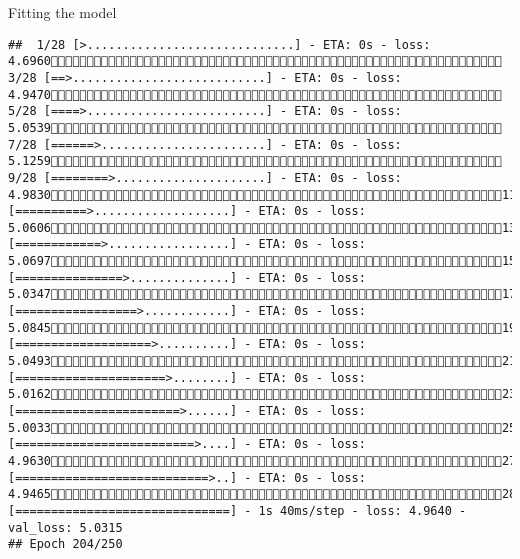 \documentclass[
  ignorenonframetext,
]{beamer}
\begin{document}
\begin{frame}[fragile]{Fitting the model}
\begin{verbatim}
##  1/28 [>.............................] - ETA: 0s - loss: 4.6960 3/28 [==>...........................] - ETA: 0s - loss: 4.9470 5/28 [====>.........................] - ETA: 0s - loss: 5.0539 7/28 [======>.......................] - ETA: 0s - loss: 5.1259 9/28 [========>.....................] - ETA: 0s - loss: 4.983011/28 [==========>...................] - ETA: 0s - loss: 5.060613/28 [============>.................] - ETA: 0s - loss: 5.069715/28 [===============>..............] - ETA: 0s - loss: 5.034717/28 [=================>............] - ETA: 0s - loss: 5.084519/28 [===================>..........] - ETA: 0s - loss: 5.049321/28 [=====================>........] - ETA: 0s - loss: 5.016223/28 [=======================>......] - ETA: 0s - loss: 5.003325/28 [=========================>....] - ETA: 0s - loss: 4.963027/28 [===========================>..] - ETA: 0s - loss: 4.946528/28 [==============================] - 1s 40ms/step - loss: 4.9640 - val_loss: 5.0315
## Epoch 204/250

\end{verbatim}
\end{frame}
\end{document}
